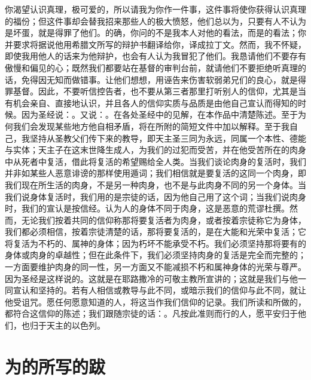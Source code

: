 你渴望认识真理，极可爱的，所以请我为你作一件事，这件事将使你获得认识真理的福份；但这件事却会替我招来那些人的极大愤怒，他们总以为，只要有人不认为是坏蛋，就是得罪了他们。的确，你问的不是我本人对他的看法，而是的看法；你并要求将据说他用希腊文所写的辩护书翻译给你，译成拉丁文。然而，我不怀疑，即使我用他人的话来为他辩护，也会有人认为我冒犯了他们。我恳请他们不要存有傲慢和偏见的心；既然我们都要站在基督的审判台前，就请他们不要拒绝听真理的话，免得因无知而做错事。让他们想想，用诬告来伤害软弱弟兄们的良心，就是得罪基督。因此，不要听信控告者，也不要从第三者那里打听别人的信仰，尤其是当有机会亲自、直接地认识，并且各人的信仰实质与品质是由他自己宣认而得知的时候。因为圣经说：。又说：。在各处圣经中的见解，在本作品中清楚陈述。至于为何我们会发现某些地方他自相矛盾，将在所附的简短文件中加以解释。至于我自己，我坚持从圣教父们传下来的教导，即天主圣三同为永远，同属一个本性、德能与实体；天主子在这末世降生成人，为我们的过犯而受苦，并在他受苦所在的肉身中从死者中复活，借此将复活的希望赐给全人类。当我们谈论肉身的复活时，我们并非如某些人恶意诽谤的那样使用遁词；我们相信就是要复活的这同一个肉身，即我们现在所生活的肉身，不是另一种肉身，也不是与此肉身不同的另一个身体。当我们说身体复活时，我们用的是宗徒的话，因为他自己用了这个词；当我们说肉身时，我们的宣认是按信经。认为人的身体不同于肉身，这是恶意的荒谬杜撰。然而，无论我们按着共同的信仰称那将要复活者为肉身，或者按着宗徒称它为身体，我们都必须相信，按着宗徒清楚的话，那将要复活的，是在大能和光荣中复活；它将复活为不朽的、属神的身体；因为朽坏不能承受不朽。我们必须坚持那将要有的身体或肉身的卓越性；但在此条件下，我们必须坚持肉身的复活是完全而完整的；一方面要维护肉身的同一性，另一方面又不能减损不朽和属神身体的光荣与尊严。因为圣经是这样说的。这就是在耶路撒冷的可敬主教所宣讲的；这就是我们与他一同宣认和坚持的。若有人相信或教导与此不同，或暗示我们的信仰与此不同，就让他受诅咒。愿任何愿意知道的人，将这当作我们信仰的记录。我们所读和所做的，都符合这信仰的陈述；我们跟随宗徒的话：。凡按此准则而行的人，愿平安归于他们，也归于天主的以色列。\par


\section{为的所写的跋}

